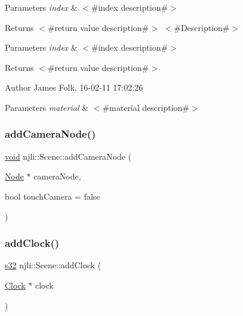 \begin{DoxyParams}{Parameters}
{\em index} & $<$\#index description\#$>$\\
\hline
\end{DoxyParams}
\begin{DoxyReturn}{Returns}
$<$\#return value description\#$>$ $<$\#\+Description\#$>$
\end{DoxyReturn}

\begin{DoxyParams}{Parameters}
{\em index} & $<$\#index description\#$>$\\
\hline
\end{DoxyParams}
\begin{DoxyReturn}{Returns}
$<$\#return value description\#$>$ 
\end{DoxyReturn}
\begin{DoxyAuthor}{Author}
James Folk, 16-\/02-\/11 17\+:02\+:26
\end{DoxyAuthor}

\begin{DoxyParams}{Parameters}
{\em material} & $<$\#material description\#$>$ \\
\hline
\end{DoxyParams}
\mbox{\label{classnjli_1_1_scene_a5cdd2ddd0c077b542290e3d2c04c52c6}} 
\subsubsection{\texorpdfstring{add\+Camera\+Node()}{addCameraNode()}}
{\footnotesize\ttfamily \mbox{\hyperlink{_thread_8h_af1e856da2e658414cb2456cb6f7ebc66}{void}} njli\+::\+Scene\+::add\+Camera\+Node (\begin{DoxyParamCaption}\item[{\mbox{\hyperlink{classnjli_1_1_node}{Node}} $\ast$}]{camera\+Node,  }\item[{bool}]{touch\+Camera = {\ttfamily false} }\end{DoxyParamCaption})}

\mbox{\label{classnjli_1_1_scene_a666d9639161eaad751d3ff373325b33e}} 
\subsubsection{\texorpdfstring{add\+Clock()}{addClock()}}
{\footnotesize\ttfamily \mbox{\hyperlink{_util_8h_aa62c75d314a0d1f37f79c4b73b2292e2}{s32}} njli\+::\+Scene\+::add\+Clock (\begin{DoxyParamCaption}\item[{\mbox{\hyperlink{classnjli_1_1_clock}{Clock}} $\ast$}]{clock }\end{DoxyParamCaption})}

